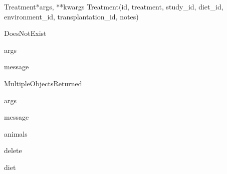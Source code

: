 \documentclass[letterpaper,10pt,english]{sphinxmanual}
\begin{document}
\hypertarget{data.models.Treatment}{}\begin{classdesc}{Treatment}{*args, **kwargs}
Treatment(id, treatment, study\_id, diet\_id, environment\_id, transplantation\_id, notes)

\hypertarget{data.models.Treatment.DoesNotExist}{}\begin{excdesc}{DoesNotExist}~

\hypertarget{data.models.Treatment.DoesNotExist.args}{}\begin{memberdesc}{args}\end{memberdesc}

\hypertarget{data.models.Treatment.DoesNotExist.message}{}\begin{memberdesc}{message}\end{memberdesc}
\end{excdesc}

\hypertarget{data.models.Treatment.MultipleObjectsReturned}{}\begin{excdesc}{MultipleObjectsReturned}~

\hypertarget{data.models.Treatment.MultipleObjectsReturned.args}{}\begin{memberdesc}{args}\end{memberdesc}

\hypertarget{data.models.Treatment.MultipleObjectsReturned.message}{}\begin{memberdesc}{message}\end{memberdesc}
\end{excdesc}

\hypertarget{data.models.Treatment.animals}{}\begin{memberdesc}[Treatment]{animals}\end{memberdesc}

\hypertarget{data.models.Treatment.delete}{}\begin{methoddesc}[Treatment]{delete}{}\end{methoddesc}

\hypertarget{data.models.Treatment.diet}{}\begin{memberdesc}[Treatment]{diet}\end{memberdesc}


\end{classdesc}
\end{document}
